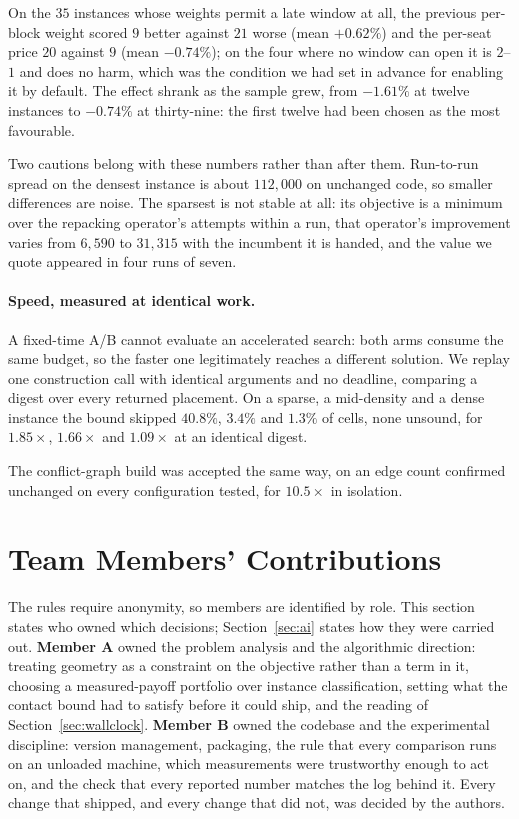 \documentclass[runningheads]{llncs}
\begin{document}
On the $35$ instances whose weights permit a late window at all, the previous per-block weight
scored $9$ better against $21$ worse (mean $+0.62\%$) and the per-seat price $20$ against $9$
(mean $-0.74\%$); on the four where no window can open it is $2$--$1$ and does no harm, which was
the condition we had set in advance for enabling it by default. The effect shrank as the sample
grew, from $-1.61\%$ at twelve instances to $-0.74\%$ at thirty-nine: the first twelve had been
chosen as the most favourable.

Two cautions belong with these numbers rather than after them. Run-to-run spread on the densest
instance is about $112{,}000$ on unchanged code, so smaller differences are noise. The sparsest is
not stable at all: its objective is a minimum over the repacking operator's attempts within a run,
that operator's improvement varies from $6{,}590$ to $31{,}315$ with the incumbent it is handed, and
the value we quote appeared in four runs of seven.

\paragraph{Speed, measured at identical work.}
A fixed-time A/B cannot evaluate an accelerated search: both arms consume the same budget, so the
faster one legitimately reaches a different solution. We replay one construction call with
identical arguments and no deadline, comparing a digest over every returned placement. On a sparse,
a mid-density and a dense instance the bound skipped $40.8\%$, $3.4\%$ and $1.3\%$ of cells, none
unsound, for $1.85\times$, $1.66\times$ and $1.09\times$ at an identical digest.


The conflict-graph build was accepted the same way, on an edge count confirmed unchanged on every
configuration tested, for $10.5\times$ in isolation.

\section{Team Members' Contributions}

The rules require anonymity, so members are identified by role. This section states who owned which
decisions; Section~\ref{sec:ai} states how they were carried out. \textbf{Member A} owned the
problem analysis and the algorithmic direction: treating geometry as a constraint on the objective
rather than a term in it, choosing a measured-payoff portfolio over instance classification, setting
what the contact bound had to satisfy before it could ship, and the reading of
Section~\ref{sec:wallclock}. \textbf{Member B} owned the codebase and the experimental
discipline: version management, packaging, the rule that every comparison runs on an unloaded
machine, which measurements were trustworthy enough to act on, and the check that every reported
number matches the log behind it. Every change that shipped, and every change that did not, was
decided by the authors.
\end{document}

